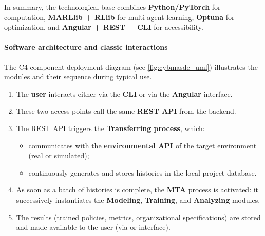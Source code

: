 \medskip
\noindent
In summary, the technological base combines \textbf{Python/PyTorch} for computation, \textbf{MARLlib + RLlib} for multi-agent learning, \textbf{Optuna} for optimization, and \textbf{Angular + REST + CLI} for accessibility.

\paragraph{Software architecture and classic interactions}

The C4 component deployment diagram (see \autoref{fig:cybmasde_uml}) illustrates the  modules and their sequence during typical use.

\begin{enumerate}
  \item The \textbf{user} interacts either via the \textbf{CLI} or via the \textbf{Angular} interface.
  \item These two access points call the same \textbf{REST API} from the backend.
  \item The REST API triggers the \textbf{Transferring process}, which:
        \begin{itemize}
          \item communicates with the \textbf{environmental API} of the target environment (real or simulated);
          \item continuously generates and stores histories in the local project database.
        \end{itemize}
  \item As soon as a batch of histories is complete, the \textbf{MTA} process is activated: it successively instantiates the \textbf{Modeling}, \textbf {Training}, and \textbf{Analyzing} modules.
  \item The results (trained policies, metrics, organizational specifications) are stored and made available to the user (via  or interface).
\end{enumerate}

